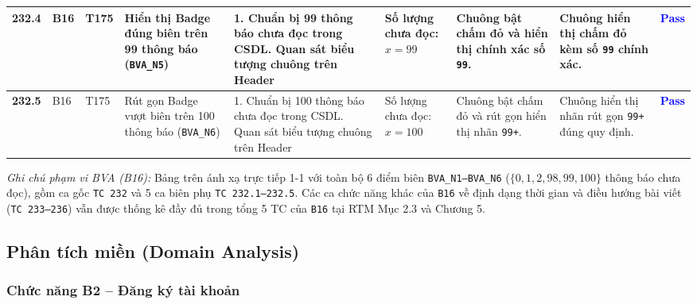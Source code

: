 \documentclass[11pt,a4paper]{article}
\begin{document}
\begin{longtable}{|C{0.9cm}|C{0.7cm}|C{0.9cm}|L{2.0cm}|L{3.0cm}|L{2.25cm}|L{2.6cm}|L{2.5cm}|C{0.85cm}|}
\textbf{232.4} & B16 & T175 & Hiển thị Badge đúng biên trên 99 thông báo (\texttt{BVA\_N5}) & 1. Chuẩn bị 99 thông báo chưa đọc trong CSDL. Quan sát biểu tượng chuông trên Header & Số lượng chưa đọc: $x = 99$ & Chuông bật chấm đỏ và hiển thị chính xác số \texttt{99}. & Chuông hiển thị chấm đỏ kèm số \texttt{99} chính xác. & \textcolor{blue}{\textbf{Pass}} \\ \hline
\textbf{232.5} & B16 & T175 & Rút gọn Badge vượt biên trên 100 thông báo (\texttt{BVA\_N6}) & 1. Chuẩn bị 100 thông báo chưa đọc trong CSDL. Quan sát biểu tượng chuông trên Header & Số lượng chưa đọc: $x = 100$ & Chuông bật chấm đỏ và rút gọn hiển thị nhãn \texttt{99+}. & Chuông hiển thị nhãn rút gọn \texttt{99+} đúng quy định. & \textcolor{blue}{\textbf{Pass}} \\ \hline
\end{longtable}
\endgroup

\noindent\textit{Ghi chú phạm vi BVA (B16):} Bảng trên ánh xạ trực tiếp 1-1 với toàn bộ 6 điểm biên \texttt{BVA\_N1--BVA\_N6} ($\{0, 1, 2, 98, 99, 100\}$ thông báo chưa đọc), gồm ca gốc \texttt{TC 232} và 5 ca biên phụ \texttt{TC 232.1--232.5}. Các ca chức năng khác của \texttt{B16} về định dạng thời gian và điều hướng bài viết (\texttt{TC 233--236}) vẫn được thống kê đầy đủ trong tổng 5 TC của \texttt{B16} tại RTM Mục 2.3 và Chương 5.


\subsection{Phân tích miền (Domain Analysis)}

\subsubsection{Chức năng B2 -- Đăng ký tài khoản}
\end{document}
